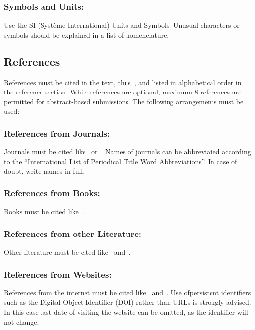 \documentclass{isprs} %
\begin{document}
\subsubsection{Symbols and Units:}\label{sec:Symbols and Units}
Use the SI (Syst\`{e}me International) Units and Symbols. Unusual characters 
or symbols should be explained in a list of nomenclature.

\subsection{References}\label{sec:References}
References must be cited in the text, thus~\cite{smith1987rep}, and listed in alphabetical order in the reference section. While references are optional, maximum 8 references are permitted for abstract-based submissions. The following arrangements must be used:

\subsubsection{References from Journals:} 
Journals must be cited like~\cite{smith1987} or~\cite{michalis2008}. Names of journals can be abbreviated according to the ``International List of Periodical Title Word Abbreviations''. In case of doubt, write names in full.

\subsubsection{References from Books:} 
Books must be cited like~\cite{foerstner2016}.

\subsubsection{References from other Literature:}
Other literature must be cited like~\cite{smith1987rep} and~\cite{smith2000}.

\subsubsection{References from Websites:}
References from the internet must be cited like~\cite{chan2017} and~\cite{maas2017}. Use ofpersistent identifiers such as the Digital Object Identifier (DOI) rather than URLs is strongly advised. In this case last date of visiting the website can be omitted, as the identifier will not change.
\end{document}

